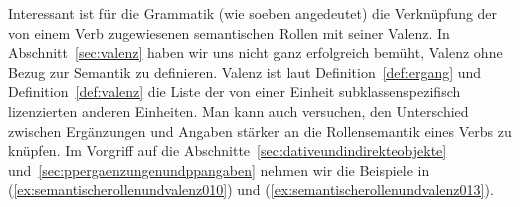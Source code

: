 
Interessant ist für die Grammatik (wie soeben angedeutet) die Verknüpfung der von einem Verb zugewiesenen semantischen Rollen mit seiner Valenz.
In Abschnitt~\ref{sec:valenz} haben wir uns nicht ganz erfolgreich bemüht, Valenz ohne Bezug zur Semantik zu definieren.
Valenz ist laut Definition~\ref{def:ergang} und Definition~\ref{def:valenz} die Liste der von einer Einheit subklassenspezifisch lizenzierten anderen Einheiten.
Man kann auch versuchen, den Unterschied zwischen Ergänzungen und Angaben stärker an die Rollensemantik eines Verbs zu knüpfen.
Im Vorgriff auf die Abschnitte~\ref{sec:dativeundindirekteobjekte} und~\ref{sec:ppergaenzungenundppangaben} nehmen wir die Beispiele in (\ref{ex:semantischerollenundvalenz010}) und (\ref{ex:semantischerollenundvalenz013}).

\begin{exe}
  \ex\label{ex:semantischerollenundvalenz010}
  \begin{xlist}
  \end{xlist}
  \ex\label{ex:semantischerollenundvalenz013}
  \begin{xlist}
  \end{xlist}
\end{exe}

